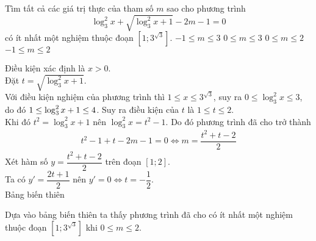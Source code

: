\begin{ex}%
 Tìm tất cả các giá trị thực của tham số $m$ sao cho phương trình $$\log_3^2 x + \sqrt{\log_3^2 x + 1 } - 2m - 1 = 0$$  có ít nhất một nghiệm thuộc đoạn $\left[1; 3^{\sqrt{3}}\right]$.
 \choice
  {$-1 \leq m \leq 3$}
  {$0 \leq m \leq 3$}
  {\True $0 \leq m \leq 2$}
  {$-1 \leq m \leq 2$}
 \loigiai
  {
  Điều kiện xác định là $x > 0$.\\
  Đặt $t = \sqrt{\log_3^2 x + 1}$.\\
  Với điều kiện nghiệm của phương trình thì $1 \leq x \leq 3^{\sqrt{3}}$, suy ra $0 \leq \log_3^2 x \leq 3$, do đó $\break 1 \leq \log_3^2 x + 1 \leq 4$.
  Suy ra điều kiện của $t$ là $1 \leq t \leq 2$.\\
  Khi đó $t^2 = \log_3^2 x + 1$ nên $\log_3^2 x = t^2 - 1$. Do đó phương trình đã cho trở thành
  \begin{eqnarray*}
   t^2 - 1 + t - 2m - 1 = 0 \Leftrightarrow m = \dfrac{t^2 + t - 2}{2}
  \end{eqnarray*}
  Xét hàm số $y = \dfrac{t^2 + t - 2}{2}$ trên đoạn $[1;2]$.\\
  Ta có $y' = \dfrac{2t + 1}{2}$ nên $y' = 0 \Leftrightarrow t = - \dfrac{1}{2}$.\\
  Bảng biến thiên
  \begin{center}
  \end{center}
  Dựa vào bảng biến thiên ta thấy phương trình đã cho có ít nhất một nghiệm thuộc đoạn $\left[1; 3^{\sqrt{3}}\right]$ khi $0 \leq m \leq 2$.
  }
\end{ex}

